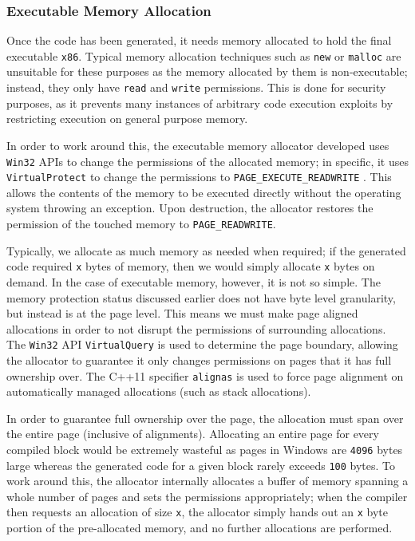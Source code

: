\subsubsection{Executable Memory Allocation}

Once the code has been generated, it needs memory allocated to hold the final executable \texttt{x86}. Typical memory allocation techniques such as \texttt{new} or \texttt{malloc} are unsuitable for these purposes as the memory allocated by them is non-executable; instead, they only have \texttt{read} and \texttt{write} permissions. This is done for security purposes, as it prevents many instances of arbitrary code execution exploits by restricting execution on general purpose memory.

In order to work around this, the executable memory allocator developed uses \texttt{Win32} APIs to change the permissions of the allocated memory; in specific, it uses \texttt{VirtualProtect} \cite{win32-VirtualProtect} to change the permissions to \texttt{PAGE\_EXECUTE\_READWRITE} \cite{win-mem-protection}. This allows the contents of the memory to be executed directly without the operating system throwing an exception. Upon destruction, the allocator restores the permission of the touched memory to \texttt{PAGE\_READWRITE}.

Typically, we allocate as much memory as needed when required; if the generated code required \texttt{x} bytes of memory, then we would simply allocate \texttt{x} bytes on demand. In the case of executable memory, however, it is not so simple. The memory protection status discussed earlier does not have byte level granularity, but instead is at the page level. This means we must make page aligned allocations in order to not disrupt the permissions of surrounding allocations. The \texttt{Win32} API \texttt{VirtualQuery} \cite{win32-VirtualQuery} is used to determine the page boundary, allowing the allocator to guarantee it only changes permissions on pages that it has full ownership over. The C++11 specifier \texttt{alignas} \cite{cpp-alignas} is used to force page alignment on automatically managed allocations (such as stack allocations).

In order to guarantee full ownership over the page, the allocation must span over the entire page (inclusive of alignments). Allocating an entire page for every compiled block would be extremely wasteful as pages in Windows are \texttt{4096} bytes large whereas the generated code for a given block rarely exceeds \texttt{100} bytes. To work around this, the allocator internally allocates a buffer of memory spanning a whole number of pages and sets the permissions appropriately; when the compiler then requests an allocation of size \texttt{x}, the allocator simply hands out an \texttt{x} byte portion of the pre-allocated memory, and no further allocations are performed.